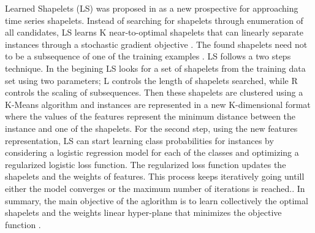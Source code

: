 Learned Shapelets (LS) was proposed in \cite{grabocka2014learning} as a new prospective for approaching time series shapelets.
Instead of searching for shapelets through enumeration of all candidates, LS learns K near-to-optimal shapelets that can linearly
separate instances through a stochastic gradient objective \cite{lines2018time,bostrom2018shapelet}.
The found shapelets need not to be a subsequence of one of the training examples \cite{bagnall2017great,schafer2017fast}.\newline
LS follows a two steps technique. In the begining LS looks for a set of shapelets from the training data set using two parameters;
L controls the length of shapelets searched, while R controls the scaling of subsequences. Then these shapelets are clustered using
a K-Means algorithm and instances are represented in a new K-dimensional format where the values of the features represent the minimum
distance between the instance and one of the shapelets.\newline
For the second step, using the new features representation, LS can start learning class probabilities for instances by considering a logistic regression model for each
of the classes and optimizing a regularized logistic loss function. The regularized loss function updates the shapelets and the weights of features.
This process keeps iteratively going untill either the model converges or the maximum number of iterations is reached.\cite{bostrom2018shapelet}.
In summary, the main objective of the aglorithm is to learn collectively the optimal shapelets and the weights
linear hyper-plane that minimizes the objective function \cite{bagnall2017great,grabocka2014learning}.